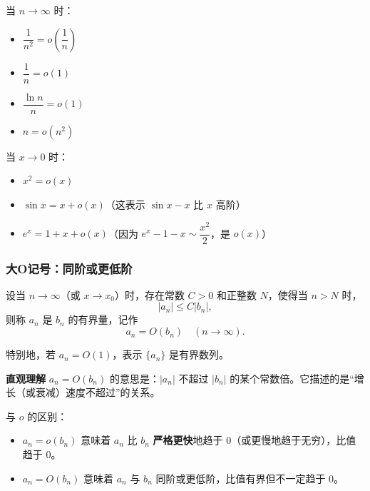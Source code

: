 \documentclass{ctexart}
\newenvironment{custom}[1]{\par\noindent \textbf{#1}\quad}{\par\vspace{1em}}
\begin{document}
\begin{example}[小o记号的例子]
当 \(n \to \infty\) 时：
\begin{itemize}
\item \(\dfrac{1}{n^2} = o\left(\dfrac{1}{n}\right)\)
\item \(\dfrac{1}{n} = o(1)\)
\item \(\dfrac{\ln n}{n} = o(1)\)
\item \(n = o(n^2)\)
\end{itemize}

当 \(x \to 0\) 时：
\begin{itemize}
\item \(x^2 = o(x)\)
\item \(\sin x = x + o(x)\)（这表示 \(\sin x - x\) 比 \(x\) 高阶）
\item \(e^x = 1 + x + o(x)\)（因为 \(e^x - 1 - x \sim \dfrac{x^2}{2}\)，是 \(o(x)\)）
\end{itemize}
\end{example}

\subsubsection{大O记号：同阶或更低阶}

\begin{definition}[大O记号]
设当 \(n \to \infty\)（或 \(x \to x_0\)）时，存在常数 \(C > 0\) 和正整数 \(N\)，使得当 \(n > N\) 时，
\[
|a_n| \leq C |b_n|,
\]
则称 \(a_n\) 是 \(b_n\) 的有界量，记作
\[
a_n = O(b_n) \quad (n \to \infty).
\]

特别地，若 \(a_n = O(1)\)，表示 \(\{a_n\}\) 是有界数列。
\end{definition}

\begin{custom}{直观理解}
\(a_n = O(b_n)\) 的意思是：\(|a_n|\) 不超过 \(|b_n|\) 的某个常数倍。它描述的是“增长（或衰减）速度不超过”的关系。

与 \(o\) 的区别：
\begin{itemize}
\item \(a_n = o(b_n)\) 意味着 \(a_n\) 比 \(b_n\) \textbf{严格更快}地趋于 0（或更慢地趋于无穷），比值趋于 0。
\item \(a_n = O(b_n)\) 意味着 \(a_n\) 与 \(b_n\) 同阶或更低阶，比值有界但不一定趋于 0。
\end{itemize}
\end{custom}
\end{document}
